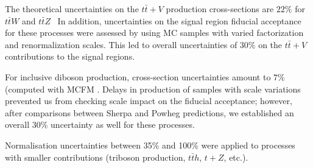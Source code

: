 The theoretical uncertainties on the $t \bar{t} + V$ production cross-sections are $22\%$ for $t\bar{t}W$ \cite{Campbell:2012dh} 
and $t\bar{t}Z$~\cite{Garzelli:2012bn} 
In addition, uncertainties on the signal region fiducial acceptance for these processes were assessed 
by using MC samples with varied factorization and renormalization scales. 
This led to overall uncertainties of $30\%$ on the $t \bar{t} + V$ contributions to the signal regions.  

For inclusive diboson production, cross-section uncertainties amount to $7\%$ (computed with MCFM \cite{Campbell:2011bn}. 
Delays in production of samples with scale variations prevented us from checking scale impact on the fiducial acceptance; 
however, after comparisons between {\sc Sherpa} and {\sc Powheg} predictions, 
we established an overall 30\% uncertainty as well for these processes. 

Normalisation uncertainties between 35\% and 100\% were applied to processes with smaller contributions (triboson 
production, $t\bar{t}h$, $t+Z$, etc.).



